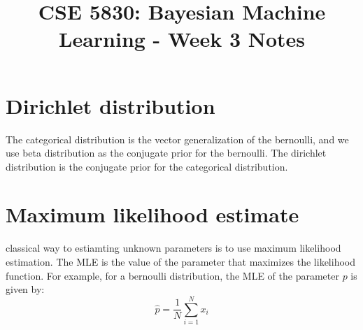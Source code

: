 \documentclass[11pt]{article}
\title{CSE 5830: Bayesian Machine Learning - Week 3 Notes}
\author{}
\date{}
\begin{document}
\maketitle
\section*{Dirichlet distribution}
The categorical distribution is the vector generalization of the bernoulli, and we use beta distribution as the conjugate prior for the bernoulli. The dirichlet distribution is the conjugate prior for the categorical distribution.
\section{Maximum likelihood estimate}
classical way to estiamting unknown parameters is to use maximum likelihood estimation. The MLE is the value of the parameter that maximizes the likelihood function. For example, for a bernoulli distribution, the MLE of the parameter $p$ is given by:
\begin{equation}
    \hat{p} = \frac{1}{N} \sum_{i=1}^{N} x_i
\end{equation}
\end{document}
